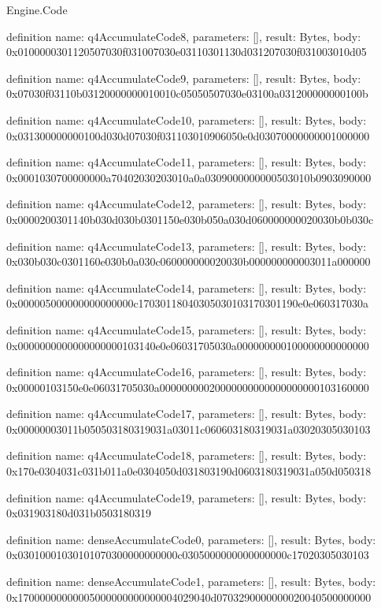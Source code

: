 \begin{lexlean}{Engine.Code}
\begin{semanticmodule}
definition{
  name: q4AccumulateCode8,
  parameters: [],
  result: Bytes,
  body: 0x0100000301120507030f031007030e03110301130d031207030f031003010d05
}

definition{
  name: q4AccumulateCode9,
  parameters: [],
  result: Bytes,
  body: 0x07030f03110b03120000000010010c05050507030e03100a031200000000100b
}

definition{
  name: q4AccumulateCode10,
  parameters: [],
  result: Bytes,
  body: 0x031300000000100d030d07030f031103010906050e0d03070000000001000000
}

definition{
  name: q4AccumulateCode11,
  parameters: [],
  result: Bytes,
  body: 0x0001030700000000a70402030203010a0a0309000000000503010b0903090000
}

definition{
  name: q4AccumulateCode12,
  parameters: [],
  result: Bytes,
  body: 0x0000200301140b030d030b0301150e030b050a030d060000000020030b0b030c
}

definition{
  name: q4AccumulateCode13,
  parameters: [],
  result: Bytes,
  body: 0x030b030c0301160e030b0a030c060000000020030b000000000003011a000000
}

definition{
  name: q4AccumulateCode14,
  parameters: [],
  result: Bytes,
  body: 0x000005000000000000000c17030118040305030103170301190e0e060317030a
}

definition{
  name: q4AccumulateCode15,
  parameters: [],
  result: Bytes,
  body: 0x0000000000000000000103140e0e06031705030a000000000100000000000000
}

definition{
  name: q4AccumulateCode16,
  parameters: [],
  result: Bytes,
  body: 0x00000103150e0e06031705030a00000000020000000000000000000103160000
}

definition{
  name: q4AccumulateCode17,
  parameters: [],
  result: Bytes,
  body: 0x00000003011b050503180319031a03011c060603180319031a03020305030103
}

definition{
  name: q4AccumulateCode18,
  parameters: [],
  result: Bytes,
  body: 0x170e0304031c031b011a0e0304050d031803190d0603180319031a050d050318
}

definition{
  name: q4AccumulateCode19,
  parameters: [],
  result: Bytes,
  body: 0x031903180d031b0503180319
}

definition{
  name: denseAccumulateCode0,
  parameters: [],
  result: Bytes,
  body: 0x03010001030101070300000000000c0305000000000000000c17020305030103
}

definition{
  name: denseAccumulateCode1,
  parameters: [],
  result: Bytes,
  body: 0x17000000000005000000000000004029040d0703290000000020040500000000
}


\end{semanticmodule}
\end{lexlean}
